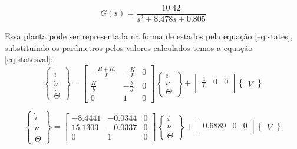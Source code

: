 \documentclass{article}
\begin{document}
\begin{equation}
\label{eq:gs}
G(s)=\frac{10.42}{s^2 + 8.478s + 0.805}
\end{equation}

Essa planta pode ser representada na forma de estados pela equação \ref{eq:states}, substituindo os parâmetros pelos valores calculados temos a equação \ref{eq:statesval}:
\begin{equation}
\label{eq:states}
\begin{Bmatrix}
\dot{i}\\ \dot{\nu} \\ \dot{\Theta} 
\end{Bmatrix} =
\begin{bmatrix}
-\frac{R+R_s}{L} & -\frac{K}{L} & 0\\
\frac{K}{b} & -\frac{b}{J} & 0\\
0 & 1 & 0
\end{bmatrix}
\begin{Bmatrix}
i\\ \nu \\ \Theta 
\end{Bmatrix} + 
\begin{bmatrix}
\frac{1}{L} & 0 & 0\\
\end{bmatrix}
\begin{Bmatrix}
V 
\end{Bmatrix}
\end{equation}

\begin{equation}
\label{eq:statesval}
\begin{Bmatrix}
\dot{i}\\ \dot{\nu} \\ \dot{\Theta} 
\end{Bmatrix} =
\begin{bmatrix}
-8.4441 & -0.0344 & 0\\
15.1303 & -0.0337 & 0\\
0 & 1 & 0
\end{bmatrix}
\begin{Bmatrix}
i\\ \nu \\ \Theta 
\end{Bmatrix} + 
\begin{bmatrix}
0.6889 & 0 & 0\\
\end{bmatrix}
\begin{Bmatrix}
V 
\end{Bmatrix}
\end{equation}

\begin{thebibliography}{widestlabel}
\end{thebibliography}
\end{document}

